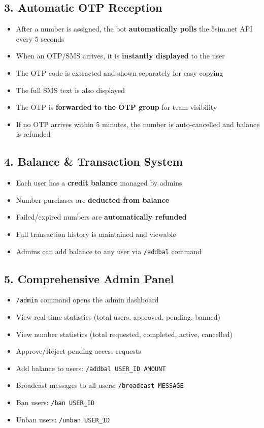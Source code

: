 \subsection{3. Automatic OTP Reception}
\begin{itemize}[leftmargin=2cm]
    \item[\ding{51}] After a number is assigned, the bot \textbf{automatically polls} the 5sim.net API every 5 seconds
    \item[\ding{51}] When an OTP/SMS arrives, it is \textbf{instantly displayed} to the user
    \item[\ding{51}] The OTP code is extracted and shown separately for easy copying
    \item[\ding{51}] The full SMS text is also displayed
    \item[\ding{51}] The OTP is \textbf{forwarded to the OTP group} for team visibility
    \item[\ding{51}] If no OTP arrives within 5 minutes, the number is auto-cancelled and balance is refunded
\end{itemize}

\subsection{4. Balance \& Transaction System}
\begin{itemize}[leftmargin=2cm]
    \item[\ding{51}] Each user has a \textbf{credit balance} managed by admins
    \item[\ding{51}] Number purchases are \textbf{deducted from balance}
    \item[\ding{51}] Failed/expired numbers are \textbf{automatically refunded}
    \item[\ding{51}] Full transaction history is maintained and viewable
    \item[\ding{51}] Admins can add balance to any user via \texttt{/addbal} command
\end{itemize}

\subsection{5. Comprehensive Admin Panel}
\begin{itemize}[leftmargin=2cm]
    \item[\ding{51}] \texttt{/admin} command opens the admin dashboard
    \item[\ding{51}] View real-time statistics (total users, approved, pending, banned)
    \item[\ding{51}] View number statistics (total requested, completed, active, cancelled)
    \item[\ding{51}] Approve/Reject pending access requests
    \item[\ding{51}] Add balance to users: \texttt{/addbal USER\_ID AMOUNT}
    \item[\ding{51}] Broadcast messages to all users: \texttt{/broadcast MESSAGE}
    \item[\ding{51}] Ban users: \texttt{/ban USER\_ID}
    \item[\ding{51}] Unban users: \texttt{/unban USER\_ID}
\end{itemize}

